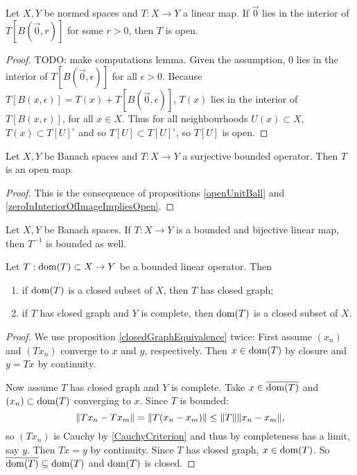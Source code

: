 \begin{proposition} \label{zeroInInteriorOfImageImpliesOpen}
Let $X,Y$ be normed spaces and $T: X\to Y$ a linear map. If $\vec{0}$ lies in the interior of $T[B(\vec{0},r)]$ for some $r>0$, then $T$ is open.
\end{proposition}
\begin{proof}
TODO: make computations lemma.
Given the assumption, $0$ lies in the interior of $T[B(\vec{0},\epsilon)]$ for all $\epsilon>0$.
Because $T[B(x,\epsilon)] = T(x) + T[B(\vec{0},\epsilon)]$, $T(x)$ lies in the interior of $T[B(x,\epsilon)]$, for all $x\in X$.
Thus for all neighbourhoods $U(x)\subset X$, $T(x)\subset T[U]^\circ$ and so $T[U] \subset T[U]^\circ$, so $T[U]$ is open.
\end{proof}

\begin{theorem}
Let $X,Y$ be Banach spaces and $T:X\to Y$ a surjective bounded operator. Then $T$ is an open map.
\end{theorem}
\begin{proof}
This is the consequence of propositions \ref{openUnitBall} and \ref{zeroInInteriorOfImageImpliesOpen}.
\end{proof}
\begin{corollary} \label{boundedInverse}
Let $X,Y$ be Banach spaces. If $T:X\to Y$ is a bounded and bijective linear map, then $T^{-1}$ is bounded as well.
\end{corollary}


\begin{proposition}
Let $T: \operatorname{dom}(T)\subset X\to Y$ be a bounded linear operator. Then
\begin{enumerate}
\item if $\operatorname{dom}(T)$ is a closed subset of $X$, then $T$ has closed graph;
\item if $T$ has closed graph and $Y$ is complete, then $\operatorname{dom}(T)$ is a closed subset of $X$.
\end{enumerate}
\end{proposition}
\begin{proof}
We use proposition \ref{closedGraphEquivalence} twice: First assume $(x_n)$ and $(Tx_n)$ converge to $x$ and $y$, respectively. Then $x\in\operatorname{dom}(T)$ by closure and $y = Tx$ by continuity.

Now assume $T$ has closed graph and $Y$ is complete. Take $x\in\overline{\operatorname{dom}(T)}$ and $(x_n)\subset \operatorname{dom}(T)$ converging to $x$. Since $T$ is bounded:
\[ \lVert Tx_n - Tx_m\rVert = \lVert T(x_n-x_m)\rVert \leq \lVert T\rVert\lVert x_n-x_m\rVert, \]
so $(Tx_n)$ is Cauchy by \ref{CauchyCriterion} and thus by completeness has a limit, say $y$. Then $Tx=y$ by continuity. Since $T$ has closed graph, $x\in\operatorname{dom}(T)$. So $\overline{\operatorname{dom}(T)}\subseteq \operatorname{dom}(T)$ and $\operatorname{dom}(T)$ is closed. 
\end{proof}

